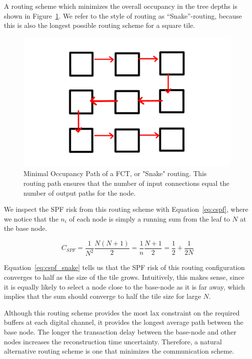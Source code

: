 A routing scheme which minimizes the overall occupancy in the tree depths is shown in Figure~\ref{fig:snake}.
We refer to the style of routing as ``Snake''-routing, because this is also the longest possible routing scheme for a square tile.

\begin{figure}[]
\centering
\includegraphics[width=\textwidth]{images/snakeroute.pdf}
\caption{Minimal Occupancy Path of a FCT, or "Snake" routing.
This routing path ensures that the number of input connections equal the number of output paths for the node.}
\label{fig:snake}
\end{figure}

We inspect the SPF risk from this routing scheme with Equation~\ref{eq:cspf}, where we notice that the $n_{i}$ of each node is simply a running sum from the leaf to $N$ at the base node.

\begin{equation}~\label{eq:cspf_snake}
  C_{SPF} = \frac{1}{N^{2}}\frac{N(N+1)}{2} = \frac{1}{n}\frac{N+1}{2} = \frac{1}{2} + \frac{1}{2N}
\end{equation}

Equation~\ref{eq:cspf_snake} tells us that the SPF risk of this routing configuration converges to half as the size of the tile grows.
Intuitively, this makes sense, since it is equally likely to select a node close to the base-node as it is far away, which implies that the sum should converge to half the tile size for large $N$.

Although this routing scheme provides the most lax constraint on the required buffers at each digital channel, it provides the longest average path between the base node.
The longer the transaction delay between the base-node and other nodes increases the reconstruction time uncertainty.
Therefore, a natural alternative routing scheme is one that minimizes the communication scheme.

